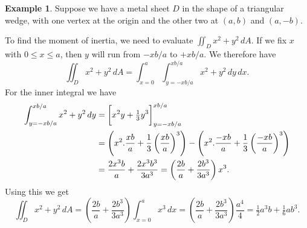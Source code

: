 \documentclass[reqno]{amsart}
\theoremstyle{definition}
\newtheorem{example}[theorem]{Example}
\begin{document}
\begin{example}
 Suppose we have a metal sheet $D$ in the shape of a triangular wedge,
 with one vertex at the origin and the other two at $(a,b)$ and
 $(a,-b)$.
 \begin{center}
 \end{center}
 To find the moment of inertia, we need to evaluate
 $\iint_Dx^2+y^2\,dA$.  If we fix $x$ with $0\leq x\leq a$, then $y$
 will run from $-xb/a$ to $+xb/a$.  We therefore have
 \[ \iint_D x^2+y^2\,dA 
     = \int_{x=0}^a \int_{y=-xb/a}^{xb/a} x^2+y^2\,dy\,dx.
 \]
 For the inner integral we have 
 \begin{align*}
  \int_{y=-xb/a}^{xb/a} x^2+y^2\,dy &= 
     \CH{x^2y+\tfrac{1}{3}y^3}_{y=-xb/a}^{xb/a} \\
  &= \left(x^2.\frac{xb}{a} + \frac{1}{3}\left(\frac{xb}{a}\right)^3\right) -
      \left(x^2.\frac{-xb}{a} + \frac{1}{3}\left(\frac{-xb}{a}\right)^3\right) \\
  &= \frac{2x^3b}{a} + \frac{2x^3b^3}{3a^3}=
       \left(\frac{2b}{a}+\frac{2b^3}{3a^3}\right)x^3.
 \end{align*}
 Using this we get
 \[ \iint_D x^2+y^2\,dA =
     \left(\frac{2b}{a}+\frac{2b^3}{3a^3}\right) \int_{x=0}^a x^3\,dx = 
     \left(\frac{2b}{a}+\frac{2b^3}{3a^3}\right) \frac{a^4}{4} = 
      \tfrac{1}{2}a^3b + \tfrac{1}{6}ab^3.
 \]
\end{example}
\end{document}
